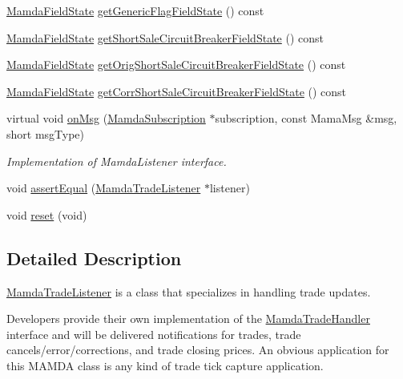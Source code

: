 \begin{CompactItemize}
\item 
\hyperlink{namespaceWombat_93aac974f2ab713554fd12a1fa3b7d2a}{Mamda\-Field\-State} \hyperlink{classWombat_1_1MamdaTradeListener_98bb7d4f99af6f7b565506fb9b79665d}{get\-Generic\-Flag\-Field\-State} () const 
\item 
\hyperlink{namespaceWombat_93aac974f2ab713554fd12a1fa3b7d2a}{Mamda\-Field\-State} \hyperlink{classWombat_1_1MamdaTradeListener_2630b69a9a27a1772e3f4315c254a466}{get\-Short\-Sale\-Circuit\-Breaker\-Field\-State} () const 
\item 
\hyperlink{namespaceWombat_93aac974f2ab713554fd12a1fa3b7d2a}{Mamda\-Field\-State} \hyperlink{classWombat_1_1MamdaTradeListener_1035dcb4392a8dbab128ae62cf9a6607}{get\-Orig\-Short\-Sale\-Circuit\-Breaker\-Field\-State} () const 
\item 
\hyperlink{namespaceWombat_93aac974f2ab713554fd12a1fa3b7d2a}{Mamda\-Field\-State} \hyperlink{classWombat_1_1MamdaTradeListener_a9ee67b51889ddb8e79a7a8a3d81af5f}{get\-Corr\-Short\-Sale\-Circuit\-Breaker\-Field\-State} () const 
\item 
virtual void \hyperlink{classWombat_1_1MamdaTradeListener_a9442f2307e319bd40fd3b274f281d58}{on\-Msg} (\hyperlink{classWombat_1_1MamdaSubscription}{Mamda\-Subscription} $\ast$subscription, const Mama\-Msg \&msg, short msg\-Type)
\begin{CompactList}\small\item\em Implementation of Mamda\-Listener interface. \item\end{CompactList}\item 
void \hyperlink{classWombat_1_1MamdaTradeListener_a856b95741b6f5bd795e626d4eedb5aa}{assert\-Equal} (\hyperlink{classWombat_1_1MamdaTradeListener}{Mamda\-Trade\-Listener} $\ast$listener)
\item 
void \hyperlink{classWombat_1_1MamdaTradeListener_2f663afb08f020bb60e7049680b2cd5e}{reset} (void)
\end{CompactItemize}


\subsection{Detailed Description}
\hyperlink{classWombat_1_1MamdaTradeListener}{Mamda\-Trade\-Listener} is a class that specializes in handling trade updates. 

Developers provide their own implementation of the \hyperlink{classWombat_1_1MamdaTradeHandler}{Mamda\-Trade\-Handler} interface and will be delivered notifications for trades, trade cancels/error/corrections, and trade closing prices. An obvious application for this MAMDA class is any kind of trade tick capture application.

